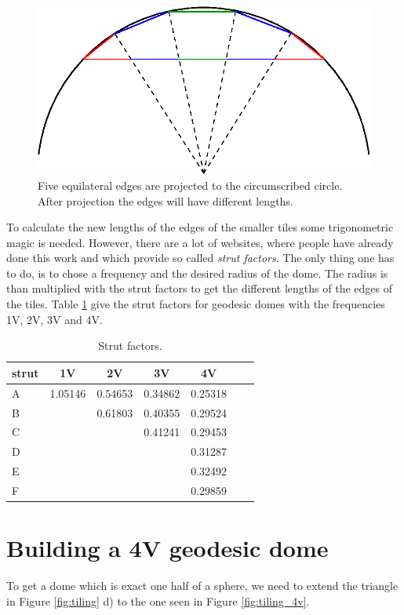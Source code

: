 \documentclass[a4paper,12pt]{article}
\begin{document}
\begin{figure}
	\centering
	\includegraphics[width=0.7\linewidth]{../images/projection.eps}
	\caption{Five equilateral edges are projected to the circumscribed circle. After projection the edges will have different lengths.}
	\label{fig:projection}
\end{figure}

To calculate the new lengths of the edges of the smaller tiles some trigonometric magic is needed. However, there are a lot of websites, where people have already done this work and which provide so called \emph{strut factors}. The only thing one has to do, is to chose a frequency and the desired radius of the dome. The radius is than multiplied with the strut factors to get the different lengths of the edges of the tiles. Table \ref{tab:strut_factors} give the strut factors for geodesic domes with the frequencies 1V, 2V, 3V and 4V.


\begin{table}
	\centering
	\caption{Strut factors.}
	\begin{tabular}{l|cccccc}
strut	&	1V		& 2V		& 3V		& 4V				\\	\hline
	A	& 1.05146	& 0.54653	& 0.34862	& 0.25318		\\
	B	&			& 0.61803	& 0.40355	& 0.29524		\\
	C	&			&			& 0.41241	& 0.29453		\\
	D	&			&			&			& 0.31287		\\
	E	&			&			&			& 0.32492		\\
	F	&			&			&			& 0.29859		
	\end{tabular}
	\label{tab:strut_factors}
\end{table}

\section{Building a 4V geodesic dome}
To get a dome which is exact one half of a sphere, we need to extend the triangle in Figure \ref{fig:tiling} d) to the one seen in Figure \ref{fig:tiling_4v}.
\end{document}
